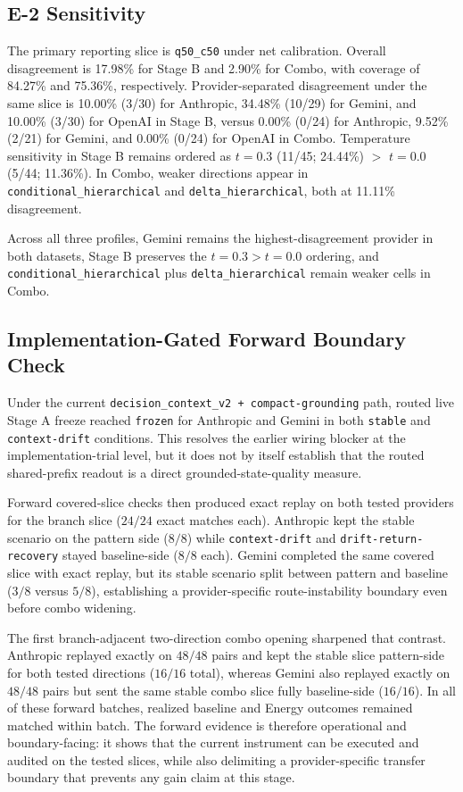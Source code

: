 \documentclass[11pt,a4paper]{article}
\begin{document}
\subsection{E-2 Sensitivity}

The primary reporting slice is \texttt{q50\_c50} under net calibration. Overall disagreement is 17.98\% for Stage B and 2.90\% for Combo, with coverage of 84.27\% and 75.36\%, respectively. Provider-separated disagreement under the same slice is 10.00\% (3/30) for Anthropic, 34.48\% (10/29) for Gemini, and 10.00\% (3/30) for OpenAI in Stage B, versus 0.00\% (0/24) for Anthropic, 9.52\% (2/21) for Gemini, and 0.00\% (0/24) for OpenAI in Combo. Temperature sensitivity in Stage B remains ordered as $t=0.3$ (11/45; 24.44\%) $>$ $t=0.0$ (5/44; 11.36\%). In Combo, weaker directions appear in \texttt{conditional\_hierarchical} and \texttt{delta\_hierarchical}, both at 11.11\% disagreement.

Across all three profiles, Gemini remains the highest-disagreement provider in both datasets, Stage B preserves the $t=0.3 > t=0.0$ ordering, and \texttt{conditional\_hierarchical} plus \texttt{delta\_hierarchical} remain weaker cells in Combo.

\subsection{Implementation-Gated Forward Boundary Check}
\label{sec:forwardboundary}

Under the current \texttt{decision\_context\_v2 + compact-grounding} path, routed live Stage A freeze reached \texttt{frozen} for Anthropic and Gemini in both \texttt{stable} and \texttt{context-drift} conditions. This resolves the earlier wiring blocker at the implementation-trial level, but it does not by itself establish that the routed shared-prefix readout is a direct grounded-state-quality measure.

Forward covered-slice checks then produced exact replay on both tested providers for the branch slice (\(24/24\) exact matches each). Anthropic kept the stable scenario on the pattern side (\(8/8\)) while \texttt{context-drift} and \texttt{drift-return-recovery} stayed baseline-side (\(8/8\) each). Gemini completed the same covered slice with exact replay, but its stable scenario split between pattern and baseline (\(3/8\) versus \(5/8\)), establishing a provider-specific route-instability boundary even before combo widening.

The first branch-adjacent two-direction combo opening sharpened that contrast. Anthropic replayed exactly on \(48/48\) pairs and kept the stable slice pattern-side for both tested directions (\(16/16\) total), whereas Gemini also replayed exactly on \(48/48\) pairs but sent the same stable combo slice fully baseline-side (\(16/16\)). In all of these forward batches, realized baseline and Energy outcomes remained matched within batch. The forward evidence is therefore operational and boundary-facing: it shows that the current instrument can be executed and audited on the tested slices, while also delimiting a provider-specific transfer boundary that prevents any gain claim at this stage.
\end{document}
